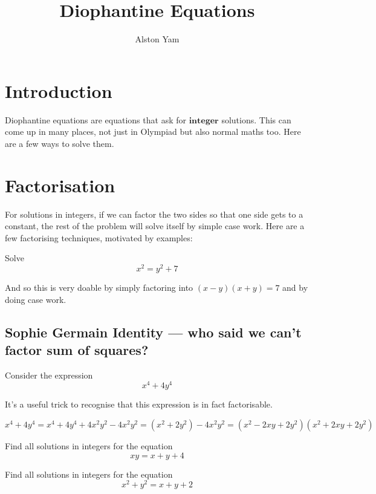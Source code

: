 \documentclass{article}
\title{Diophantine Equations}
\author{Alston Yam}
\date{}
\theoremstyle{mytheoremstyle}
\theoremstyle{mytheoremstyle}
\theoremstyle{myproblemstyle}
\theoremstyle{myproblemstyle}
\begin{document}
    \maketitle

    \section{Introduction}
    Diophantine equations are equations that ask for $\textbf{integer}$ solutions. This can come up in many places, not just in Olympiad but also normal maths too. Here are a few ways to solve them.

    \section{Factorisation}
    For solutions in integers, if we can factor the two sides so that one side gets to a constant, the rest of the problem will solve itself by simple case work. Here are a few factorising techniques, motivated by examples:

    \begin{example}
        Solve 
        \[x^2 = y^2 + 7\]
    \end{example}

    And so this is very doable by simply factoring into $(x-y)(x+y) = 7$ and by doing case work.

    \subsection{Sophie Germain Identity — who said we can't factor sum of squares?}

    Consider the expression 
    \[x^4 + 4y^4\]

    It's a useful trick to recognise that this expression is in fact factorisable.

    \[x^4 + 4y^4 = x^4 + 4y^4 + 4x^2y^2 - 4x^2y^2 = (x^2 + 2y^2) - 4x^2y^2 = (x^2 - 2xy + 2y^2)(x^2 + 2xy + 2y^2)\]

    \begin{problem}
        Find all solutions in integers for the equation
        \[xy = x + y + 4\]
    \end{problem}

    \begin{problem}
        Find all solutions in integers for the equation
        \[x^2 + y^2 = x + y + 2\]
    \end{problem}
\end{document}
